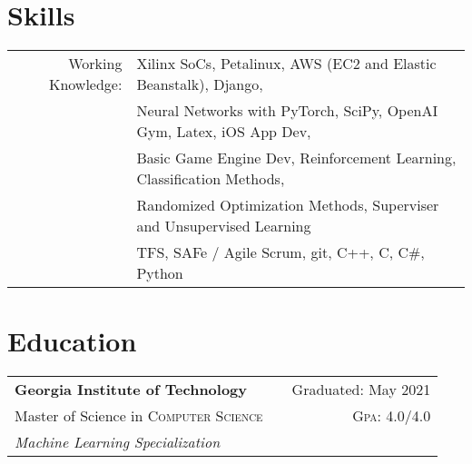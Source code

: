 \documentclass[a4paper,11pt]{article}
\begin{document}

\pagestyle{empty} %

\par{ \smallskip\par}



\section{Skills}
\begin{tabularx}{\textwidth}{rl}
   Working Knowledge: & Xilinx SoCs, Petalinux, AWS (EC2 and Elastic Beanstalk), Django, \\
                                     & Neural Networks with PyTorch, SciPy, OpenAI Gym, Latex, iOS App Dev, \\
                                     & Basic Game Engine Dev, Reinforcement Learning, Classification Methods, \\
                                     & Randomized Optimization Methods, Superviser and Unsupervised Learning \\
                                     & TFS, SAFe / Agile Scrum, git, C++, C, C\#, Python\\
\end{tabularx}

\hfill
\section{Education}
\begin{tabularx}{\textwidth}{lXr}
   \textbf{Georgia Institute of Technology} & & Graduated: May 2021\\
   Master of Science in \textsc{Computer Science} & & \normalsize \textsc{Gpa}: 4.0/4.0\\
   \emph{Machine Learning Specialization}
\end{tabularx}
\end{document}
